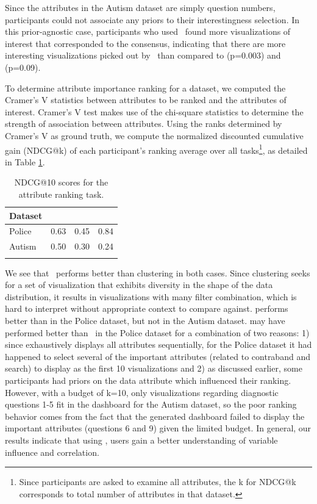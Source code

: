 \par Since the attributes in the Autism dataset are simply question numbers, participants could not associate any priors to their interestingness selection. In this prior-agnostic case, participants who used \system\ found more visualizations of interest that corresponded to the consensus, indicating that there are more interesting visualizations picked out by \system\ than compared to \BFS (p=0.003) and \cluster (p=0.09).

To determine attribute importance ranking for a dataset, we computed the Cramer's V statistics between attributes to be ranked and the attributes of interest. Cramer's V test makes use of the chi-square statistics to determine the strength of association between attributes. Using the ranks determined by Cramer's V as ground truth, we compute the normalized discounted cumulative gain (NDCG@k) of each participant's ranking average over all tasks\footnote{Since participants are asked to examine all attributes, the k for NDCG@k corresponds to total number of attributes in that dataset.}, as detailed in Table \ref{table:ndcgRankingResult}.
\begin{table}[ht!]
	\centering
	\begin{tabular}{lrrr}
	\hline
	 Dataset   &   \system &   \cluster &   \BFS \\
	\hline
	 Police    &      0.63 &      0.45 &  0.84 \\
	 Autism    &      0.50 &      0.30 &  0.24 \\
	\hline
	\label{table:ndcg_ranking_result}
	\end{tabular}
	\caption{NDCG@10 scores for the attribute ranking task.}
	\vspace{-10pt}
    \label{table:ndcgRankingResult}
\end{table}
We see that \system\ performs better than clustering in both cases. Since clustering seeks for a set of visualization that exhibits diversity in the shape of the data distribution, it results in visualizations with many filter combination, which is hard to interpret without appropriate context to compare against. \BFS performs better than \system in the Police dataset, but not in the Autism dataset. \BFS may have performed better than \system\ in the Police dataset for a combination of two reasons: 1) since \BFS exhaustively displays all attributes sequentially, for the Police dataset it had happened to select several of the important attributes (related to contraband and search) to display as the first 10 visualizations and 2) as discussed earlier, some participants had priors on the data attribute which influenced their ranking. However, with a budget of k=10, only visualizations regarding diagnostic questions 1-5 fit in the dashboard for the Autism dataset, so the poor ranking behavior comes from the fact that the \BFS generated dashboard failed to display the important attributes (questions 6 and 9) given the limited budget. In general, our results indicate that using \system, users gain a better understanding of variable influence and correlation.
